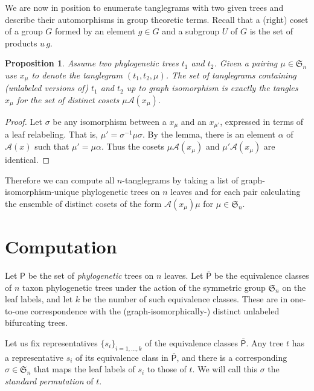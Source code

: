 \documentclass{amsart}
\newtheorem{proposition}{Proposition}
\newcommand{\fS}{\mathfrak S}
\newcommand{\aut}{\mathcal A}
\newcommand{\pairing}{\mu}
\newcommand{\ptree}{\mathsf{P}}
\newcommand{\ptequiv}{\bar{\ptree}}  %
\begin{document}
We are now in position to enumerate tanglegrams with two given trees and describe their automorphisms in group theoretic terms.
Recall that a (right) coset of a group $G$ formed by an element $g \in G$ and a subgroup $U$ of $G$ is the set of products $u\, g$.
\begin{proposition}
\label{prop:cosets}
Assume two phylogenetic trees $t_1$ and $t_2$.
Given a pairing $\pairing \in \fS_n$ use $x_\pairing$ to denote the tanglegram $(t_1, t_2, \pairing)$.
The set of tanglegrams containing (unlabeled versions of) $t_1$ and $t_2$ up to graph isomorphism is exactly the tangles $x_\pairing$ for the set of distinct cosets $\pairing \aut(x_\pairing)$.
\end{proposition}
\begin{proof}
Let $\sigma$ be any isomorphism between a $x_\pairing$ and an $x_{\pairing'}$, expressed in terms of a leaf relabeling.
That is, $\pairing' = \sigma^{-1} \pairing \sigma$.
By the lemma, there is an element $\alpha$ of $\aut(x)$ such that $\pairing' = \pairing \alpha$.
Thus the cosets $\pairing \aut(x_\pairing)$ and $\pairing' \aut(x_\pairing)$ are identical.
\end{proof}

Therefore we can compute all $n$-tanglegrams by taking a list of graph-isomorphism-unique phylogenetic trees on $n$ leaves and for each pair calculating the ensemble of distinct cosets of the form $\aut(x_\pairing) \pairing$ for $\pairing \in \fS_n$.



\section{Computation}
Let $\ptree$ be the set of \emph{phylogenetic} trees on $n$ leaves.
Let $\ptequiv$ be the equivalence classes of $n$ taxon phylogenetic trees under the action of the symmetric group $\fS_n$ on the leaf labels, and let $k$ be the number of such equivalence classes.
These are in one-to-one correspondence with the (graph-isomorphically-) distinct unlabeled bifurcating trees.

Let us fix representatives $\{s_i\}_{i=1,\ldots,k}$ of the equivalence classes $\ptequiv$.
Any tree $t$ has a representative $s_i$ of its equivalence class in $\ptequiv$, and there is a corresponding $\sigma \in \fS_n$ that maps the leaf labels of $s_i$ to those of $t$.
We will call this $\sigma$ the \emph{standard permutation} of $t$.
\end{document}
